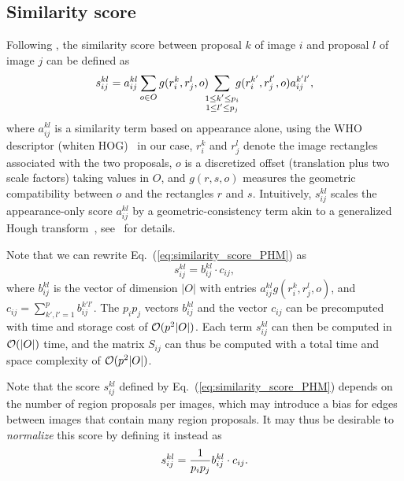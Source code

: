 \documentclass[10pt,twocolumn,letterpaper]{article}
\numberwithin{theorem}{section}
\begin{document}
\subsection{Similarity score}
Following \cite{CKSP15}, the similarity score
between proposal $k$ of image $i$ and proposal $l$ of image
$j$ can be defined as
\begin{equation}
\label{eq:similarity_score_PHM}
s_{ij}^{kl} = 
a_{ij}^{kl} \sum_{o\in O} 
g(r_i^k,r_j^l,o) 
\!\!\!\sum_{\substack{1 \leq k' \leq p_i \\ 1 \leq l' \leq p_j}} \!\!\!g(r_i^{k'},r_j^{l'},o) a_{ij}^{k'l'},
\vspace{-2mm}
\end{equation}
where $a_{ij}^{kl}$ is a similarity term based on appearance alone,
using the WHO descriptor (whiten HOG)~\cite{dalal2005histograms, hariharan2012who} in our case,
$r_i^k$ and $r_j^l$ denote the image rectangles associated with the
two proposals, $o$ is a discretized offset (translation plus two scale
factors) taking values in $O$, and $g(r,s,o)$ measures the geometric
compatibility between $o$ and the rectangles $r$ and $s$.
Intuitively, $s_{ij}^{kl}$ scales the appearance-only score
$a_{ij}^{kl}$ by a geometric-consistency term akin to a generalized
Hough transform~\cite{Ballard81}, see~\cite{CKSP15} for details.

Note that we can rewrite Eq.~(\ref{eq:similarity_score_PHM}) as
\begin{equation}
s_{ij}^{kl}=b_{ij}^{kl}\cdot c_{ij},
\end{equation}
where $b_{ij}^{kl}$ is the vector of dimension $|O|$ with entries
$a_{ij}^{kl}g(r_i^k,r_j^l,o)$, and $c_{ij}=\sum_{k',l'=1}^p
b_{ij}^{k'l'}$.  
The $p_ip_j$ vectors $b_{ij}^{kl}$ and the vector $c_{ij}$ can be
precomputed with time and storage cost of ${\cal O}(p^2|O|)$. Each
term $s_{ij}^{kl}$ can then be computed in ${\cal O}(|O|)$ time, and
the matrix $S_{ij}$ can thus be computed with a total time and space
complexity of ${\cal O}(p^2|O|)$.

Note that the score $s_{ij}^{kl}$ defined by
Eq.~(\ref{eq:similarity_score_PHM}) depends on the number of
region proposals per images, which may introduce a bias for
edges between images that contain many region proposals. It may
thus be desirable to {\em normalize} this score by defining it instead as
\begin{equation}
\label{eq:similarity_score_PHM_normalized}
s_{ij}^{kl}=\dfrac{1}{p_ip_j}b_{ij}^{kl}\cdot c_{ij}.
\vspace{-2mm}
\end{equation}
\end{document}
